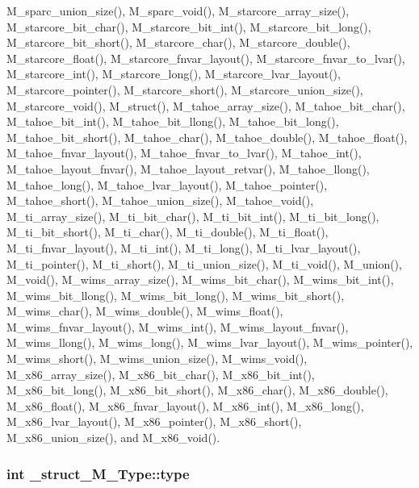 M\_\-sparc\_\-union\_\-size(), M\_\-sparc\_\-void(), M\_\-starcore\_\-array\_\-size(), M\_\-starcore\_\-bit\_\-char(), M\_\-starcore\_\-bit\_\-int(), M\_\-starcore\_\-bit\_\-long(), M\_\-starcore\_\-bit\_\-short(), M\_\-starcore\_\-char(), M\_\-starcore\_\-double(), M\_\-starcore\_\-float(), M\_\-starcore\_\-fnvar\_\-layout(), M\_\-starcore\_\-fnvar\_\-to\_\-lvar(), M\_\-starcore\_\-int(), M\_\-starcore\_\-long(), M\_\-starcore\_\-lvar\_\-layout(), M\_\-starcore\_\-pointer(), M\_\-starcore\_\-short(), M\_\-starcore\_\-union\_\-size(), M\_\-starcore\_\-void(), M\_\-struct(), M\_\-tahoe\_\-array\_\-size(), M\_\-tahoe\_\-bit\_\-char(), M\_\-tahoe\_\-bit\_\-int(), M\_\-tahoe\_\-bit\_\-llong(), M\_\-tahoe\_\-bit\_\-long(), M\_\-tahoe\_\-bit\_\-short(), M\_\-tahoe\_\-char(), M\_\-tahoe\_\-double(), M\_\-tahoe\_\-float(), M\_\-tahoe\_\-fnvar\_\-layout(), M\_\-tahoe\_\-fnvar\_\-to\_\-lvar(), M\_\-tahoe\_\-int(), M\_\-tahoe\_\-layout\_\-fnvar(), M\_\-tahoe\_\-layout\_\-retvar(), M\_\-tahoe\_\-llong(), M\_\-tahoe\_\-long(), M\_\-tahoe\_\-lvar\_\-layout(), M\_\-tahoe\_\-pointer(), M\_\-tahoe\_\-short(), M\_\-tahoe\_\-union\_\-size(), M\_\-tahoe\_\-void(), M\_\-ti\_\-array\_\-size(), M\_\-ti\_\-bit\_\-char(), M\_\-ti\_\-bit\_\-int(), M\_\-ti\_\-bit\_\-long(), M\_\-ti\_\-bit\_\-short(), M\_\-ti\_\-char(), M\_\-ti\_\-double(), M\_\-ti\_\-float(), M\_\-ti\_\-fnvar\_\-layout(), M\_\-ti\_\-int(), M\_\-ti\_\-long(), M\_\-ti\_\-lvar\_\-layout(), M\_\-ti\_\-pointer(), M\_\-ti\_\-short(), M\_\-ti\_\-union\_\-size(), M\_\-ti\_\-void(), M\_\-union(), M\_\-void(), M\_\-wims\_\-array\_\-size(), M\_\-wims\_\-bit\_\-char(), M\_\-wims\_\-bit\_\-int(), M\_\-wims\_\-bit\_\-llong(), M\_\-wims\_\-bit\_\-long(), M\_\-wims\_\-bit\_\-short(), M\_\-wims\_\-char(), M\_\-wims\_\-double(), M\_\-wims\_\-float(), M\_\-wims\_\-fnvar\_\-layout(), M\_\-wims\_\-int(), M\_\-wims\_\-layout\_\-fnvar(), M\_\-wims\_\-llong(), M\_\-wims\_\-long(), M\_\-wims\_\-lvar\_\-layout(), M\_\-wims\_\-pointer(), M\_\-wims\_\-short(), M\_\-wims\_\-union\_\-size(), M\_\-wims\_\-void(), M\_\-x86\_\-array\_\-size(), M\_\-x86\_\-bit\_\-char(), M\_\-x86\_\-bit\_\-int(), M\_\-x86\_\-bit\_\-long(), M\_\-x86\_\-bit\_\-short(), M\_\-x86\_\-char(), M\_\-x86\_\-double(), M\_\-x86\_\-float(), M\_\-x86\_\-fnvar\_\-layout(), M\_\-x86\_\-int(), M\_\-x86\_\-long(), M\_\-x86\_\-lvar\_\-layout(), M\_\-x86\_\-pointer(), M\_\-x86\_\-short(), M\_\-x86\_\-union\_\-size(), and M\_\-x86\_\-void().
\subsubsection{\setlength{\rightskip}{0pt plus 5cm}int \bf{\_\-struct\_\-M\_\-Type::type}}\label{struct__struct__M__Type_4dd23e14df3e670e23634b33cd567ad4}




